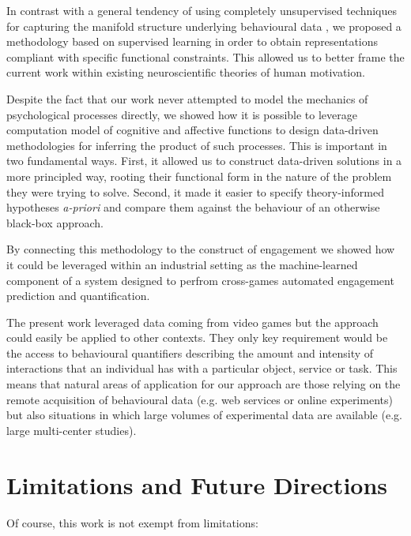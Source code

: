 In contrast with a general tendency of using completely unsupervised techniques for capturing the manifold structure underlying behavioural data \cite{calhoun2019unsupervised, luxem2020identifying, pereira2020quantifying, shi2021learning, mccullough2021unsupervised}, we proposed a methodology based on supervised learning in order to obtain representations compliant with specific functional constraints. This allowed us to better frame the current work within existing neuroscientific theories of human motivation. 

Despite the fact that our work never attempted to model the mechanics of psychological processes directly, we showed how it is possible to leverage computation model of cognitive and affective functions to design data-driven methodologies for inferring the product of such processes. This is important in two fundamental ways. First, it allowed us to construct data-driven solutions in a more principled way, rooting their functional form in the nature of the problem they were trying to solve. Second, it made it easier to specify theory-informed hypotheses \textit{a-priori} and compare them against the behaviour of an otherwise black-box approach.

By connecting this methodology to the construct of engagement we showed how it could be leveraged within an industrial setting as the machine-learned component of a system designed to perfrom cross-games automated engagement prediction and quantification.

The present work leveraged data coming from video games but the approach could easily be applied to other contexts. They only key requirement would be the access to behavioural quantifiers describing the amount and intensity of interactions that an individual has with a particular object, service or task. This means that natural areas of application for our approach are those relying on the remote acquisition of behavioural data (e.g. web services or online experiments) but also situations in which large volumes of experimental data are available (e.g. large multi-center studies).

\section{Limitations and Future Directions}
\label{discussion_limitations}
Of course, this work is not exempt from limitations:


